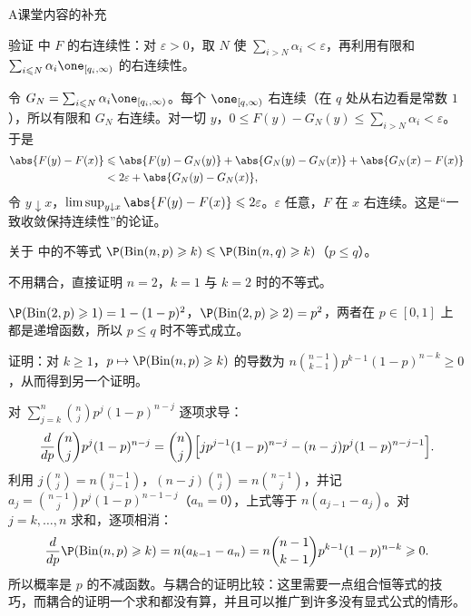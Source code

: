 \begin{exercises}{A}{课堂内容的补充}
\item\label{ex:distributions:A9} 验证 中 $F$ 的右连续性：对 $\varepsilon>0$，取 $N$ 使 $\sum_{i>N}\alpha_i<\varepsilon$，再利用有限和 $\sum_{i\leqslant N}\alpha_i\one_{[q_i,\infty)}$ 的右连续性。
\begin{solution}
令 $G_N=\sum_{i\leqslant N}\alpha_i\one_{[q_i,\infty)}$。每个 $\one_{[q,\infty)}$ 右连续（在 $q$ 处从右边看是常数 $1$），所以有限和 $G_N$ 右连续。对一切 $y$，$0\leqslant F(y)-G_N(y)\leqslant\sum_{i>N}\alpha_i<\varepsilon$。于是
\[
\begin{aligned}
\abs{F(y)-F(x)}&\leqslant\abs{F(y)-G_N(y)}+\abs{G_N(y)-G_N(x)}+\abs{G_N(x)-F(x)}\\
&<2\varepsilon+\abs{G_N(y)-G_N(x)},
\end{aligned}
\]
令 $y\downarrow x$，$\limsup_{y\downarrow x}\abs{F(y)-F(x)}\leqslant2\varepsilon$。$\varepsilon$ 任意，$F$ 在 $x$ 右连续。这是“一致收敛保持连续性”的论证。
\end{solution}

\item\label{ex:distributions:A10} 关于 中的不等式 $\P(\mathrm{Bin}(n,p)\geqslant k)\leqslant \P(\mathrm{Bin}(n,q)\geqslant k)$（$p\leqslant q$）。
\begin{questions}
\item 不用耦合，直接证明 $n=2$，$k=1$ 与 $k=2$ 时的不等式。
\begin{solution}
$\P(\mathrm{Bin}(2,p)\geqslant1)=1-(1-p)^2$，$\P(\mathrm{Bin}(2,p)\geqslant2)=p^2$，两者在 $p\in[0,1]$ 上都是递增函数，所以 $p\leqslant q$ 时不等式成立。
\end{solution}
\item 证明：对 $k\geqslant1$，$p\mapsto \P(\mathrm{Bin}(n,p)\geqslant k)$ 的导数为 $n\binom{n-1}{k-1}p^{k-1}(1-p)^{n-k}\geqslant0$，从而得到另一个证明。
\begin{solution}
对 $\sum_{j=k}^n\binom njp^j(1-p)^{n-j}$ 逐项求导：
\[
\frac{d}{dp}\binom njp^j(1-p)^{n-j}=\binom nj\Bigl[jp^{j-1}(1-p)^{n-j}-(n-j)p^j(1-p)^{n-j-1}\Bigr].
\]
利用 $j\binom nj=n\binom{n-1}{j-1}$，$(n-j)\binom nj=n\binom{n-1}j$，并记 $a_j=\binom{n-1}jp^j(1-p)^{n-1-j}$（$a_n=0$），上式等于 $n(a_{j-1}-a_j)$。对 $j=k,\dots,n$ 求和，逐项相消：
\[
\frac{d}{dp}\P(\mathrm{Bin}(n,p)\geqslant k)=n(a_{k-1}-a_n)=n\binom{n-1}{k-1}p^{k-1}(1-p)^{n-k}\geqslant0 .
\]
所以概率是 $p$ 的不减函数。与耦合的证明比较：这里需要一点组合恒等式的技巧，而耦合的证明一个求和都没有算，并且可以推广到许多没有显式公式的情形。
\end{solution}
\end{questions}
\end{exercises}


